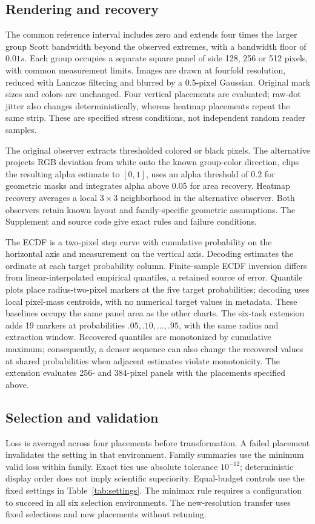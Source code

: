\documentclass[11pt]{article}
\begin{document}
\subsection*{Rendering and recovery}
The common reference interval includes zero and extends four times the larger group Scott bandwidth beyond the observed extremes, with a bandwidth floor of $0.01s$. Each group occupies a separate square panel of side 128, 256 or 512 pixels, with common measurement limits. Images are drawn at fourfold resolution, reduced with Lanczos filtering and blurred by a 0.5-pixel Gaussian. Original mark sizes and colors are unchanged. Four vertical placements are evaluated; raw-dot jitter also changes deterministically, whereas heatmap placements repeat the same strip. These are specified stress conditions, not independent random reader samples.

The original observer extracts thresholded colored or black pixels. The alternative projects RGB deviation from white onto the known group-color direction, clips the resulting alpha estimate to $[0,1]$, uses an alpha threshold of 0.2 for geometric masks and integrates alpha above 0.05 for area recovery. Heatmap recovery averages a local $3\times3$ neighborhood in the alternative observer. Both observers retain known layout and family-specific geometric assumptions. The Supplement and source code give exact rules and failure conditions.

The ECDF is a two-pixel step curve with cumulative probability on the horizontal axis and measurement on the vertical axis. Decoding estimates the ordinate at each target probability column. Finite-sample ECDF inversion differs from linear-interpolated empirical quantiles, a retained source of error. Quantile plots place radius-two-pixel markers at the five target probabilities; decoding uses local pixel-mass centroids, with no numerical target values in metadata. These baselines occupy the same panel area as the other charts. The six-task extension adds 19 markers at probabilities $.05,.10,\ldots,.95$, with the same radius and extraction window. Recovered quantiles are monotonized by cumulative maximum; consequently, a denser sequence can also change the recovered values at shared probabilities when adjacent estimates violate monotonicity. The extension evaluates 256- and 384-pixel panels with the placements specified above.

\subsection*{Selection and validation}
Loss is averaged across four placements before transformation. A failed placement invalidates the setting in that environment. Family summaries use the minimum valid loss within family. Exact ties use absolute tolerance $10^{-12}$; deterministic display order does not imply scientific superiority. Equal-budget controls use the fixed settings in Table~\ref{tab:settings}. The minimax rule requires a configuration to succeed in all six selection environments. The new-resolution transfer uses fixed selections and new placements without retuning.
\end{document}
